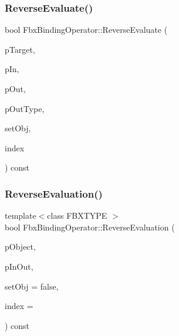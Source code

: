 \mbox{\label{class_fbx_binding_operator_a7528f0c6f942433c0c5c78fc5e803bbc}} 
\subsubsection{\texorpdfstring{Reverse\+Evaluate()}{ReverseEvaluate()}}
{\footnotesize\ttfamily bool Fbx\+Binding\+Operator\+::\+Reverse\+Evaluate (\begin{DoxyParamCaption}\item[{const \hyperlink{class_fbx_object}{Fbx\+Object} $\ast$}]{p\+Target,  }\item[{const void $\ast$}]{p\+In,  }\item[{void $\ast$$\ast$}]{p\+Out,  }\item[{\hyperlink{fbxpropertytypes_8h_a73913a5ddfb20e57c6f25e9e6784bd92}{E\+Fbx\+Type} $\ast$}]{p\+Out\+Type,  }\item[{bool}]{set\+Obj,  }\item[{int}]{index }\end{DoxyParamCaption}) const\hspace{0.3cm}{\ttfamily [protected]}}

\mbox{\label{class_fbx_binding_operator_ac7e93e46c1aea6fa49dca09d3f2df342}} 
\subsubsection{\texorpdfstring{Reverse\+Evaluation()}{ReverseEvaluation()}}
{\footnotesize\ttfamily template$<$class F\+B\+X\+T\+Y\+PE $>$ \\
bool Fbx\+Binding\+Operator\+::\+Reverse\+Evaluation (\begin{DoxyParamCaption}\item[{const \hyperlink{class_fbx_object}{Fbx\+Object} $\ast$}]{p\+Object,  }\item[{F\+B\+X\+T\+Y\+PE $\ast$}]{p\+In\+Out,  }\item[{bool}]{set\+Obj = {\ttfamily false},  }\item[{int}]{index = {} }\end{DoxyParamCaption}) const\hspace{0.3cm}{\ttfamily [inline]}}

